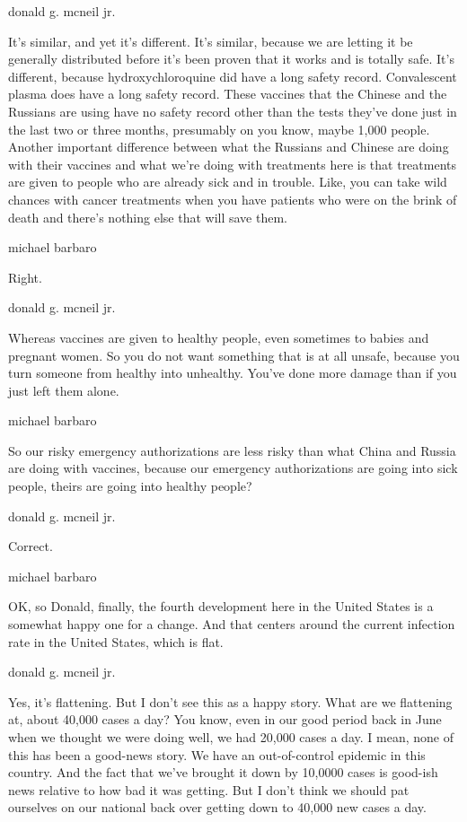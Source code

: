 donald g. mcneil jr.

It's similar, and yet it's different. It's similar, because we are
letting it be generally distributed before it's been proven that it
works and is totally safe. It's different, because hydroxychloroquine
did have a long safety record. Convalescent plasma does have a long
safety record. These vaccines that the Chinese and the Russians are
using have no safety record other than the tests they've done just in
the last two or three months, presumably on you know, maybe 1,000
people. Another important difference between what the Russians and
Chinese are doing with their vaccines and what we're doing with
treatments here is that treatments are given to people who are already
sick and in trouble. Like, you can take wild chances with cancer
treatments when you have patients who were on the brink of death and
there's nothing else that will save them.

michael barbaro

Right.

donald g. mcneil jr.

Whereas vaccines are given to healthy people, even sometimes to babies
and pregnant women. So you do not want something that is at all unsafe,
because you turn someone from healthy into unhealthy. You've done more
damage than if you just left them alone.

michael barbaro

So our risky emergency authorizations are less risky than what China and
Russia are doing with vaccines, because our emergency authorizations are
going into sick people, theirs are going into healthy people?

donald g. mcneil jr.

Correct.

michael barbaro

OK, so Donald, finally, the fourth development here in the United States
is a somewhat happy one for a change. And that centers around the
current infection rate in the United States, which is flat.

donald g. mcneil jr.

Yes, it's flattening. But I don't see this as a happy story. What are we
flattening at, about 40,000 cases a day? You know, even in our good
period back in June when we thought we were doing well, we had 20,000
cases a day. I mean, none of this has been a good-news story. We have an
out-of-control epidemic in this country. And the fact that we've brought
it down by 10,0000 cases is good-ish news relative to how bad it was
getting. But I don't think we should pat ourselves on our national back
over getting down to 40,000 new cases a day.

